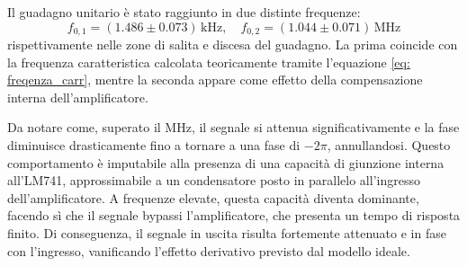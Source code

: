 \documentclass[a4paper,12pt]{article}
\begin{document}
Il guadagno unitario è stato raggiunto in due distinte frequenze:
\[
f_{0,1} = (1.486 \pm 0.073)\,\si{\kilo\hertz}, \quad
f_{0,2} = (1.044 \pm 0.071)\,\si{\mega\hertz}
\]
rispettivamente nelle zone di salita e discesa del guadagno. La prima coincide con la frequenza caratteristica calcolata teoricamente tramite l’equazione \eqref{eq: freqenza_carr}, mentre la seconda appare come effetto della compensazione interna dell’amplificatore.

Da notare come, superato il \si{\mega\hertz}, il segnale si attenua significativamente e la fase diminuisce drasticamente fino a tornare a una fase di \(-2\pi\), annullandosi. Questo comportamento è imputabile alla presenza di una capacità di giunzione interna all’LM741, approssimabile a un condensatore posto in parallelo all’ingresso dell’amplificatore. A frequenze elevate, questa capacità diventa dominante, facendo sì che il segnale bypassi l’amplificatore, che presenta un tempo di risposta finito. Di conseguenza, il segnale in uscita risulta fortemente attenuato e in fase con l’ingresso, vanificando l’effetto derivativo previsto dal modello ideale.




\end{document}
